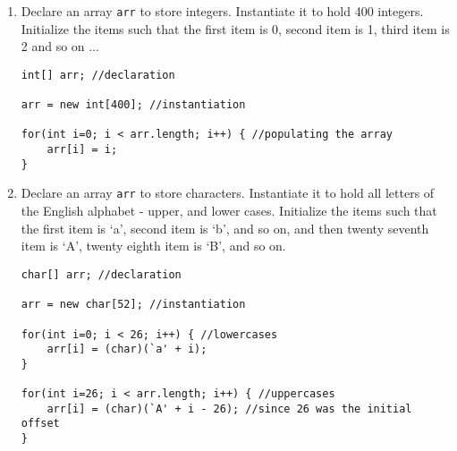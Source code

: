 \begin{questions}
\begin{enumerate}
\item Declare an array \texttt{arr} to store integers. Instantiate it to hold 400 integers. Initialize the items such that the first item is 0, second item is 1, third item is 2 and so on ...

\begin{solution}
\begin{lstlisting}
int[] arr; //declaration

arr = new int[400]; //instantiation

for(int i=0; i < arr.length; i++) { //populating the array
	arr[i] = i;
}
\end{lstlisting}
\end{solution}

\item Declare an array \texttt{arr} to store characters. Instantiate it to hold all letters of the English alphabet - upper, and lower cases. Initialize the items such that the first item is `a', second item is `b', and so on, and then twenty seventh item is `A', twenty eighth item is `B', and so on.

\begin{solution}
\begin{lstlisting}
char[] arr; //declaration

arr = new char[52]; //instantiation

for(int i=0; i < 26; i++) { //lowercases
	arr[i] = (char)(`a' + i);
}

for(int i=26; i < arr.length; i++) { //uppercases
	arr[i] = (char)(`A' + i - 26); //since 26 was the initial offset
}
\end{lstlisting}
\end{solution}

\end{enumerate}

\newpage

\begin{center}

\end{center}



\end{questions}
